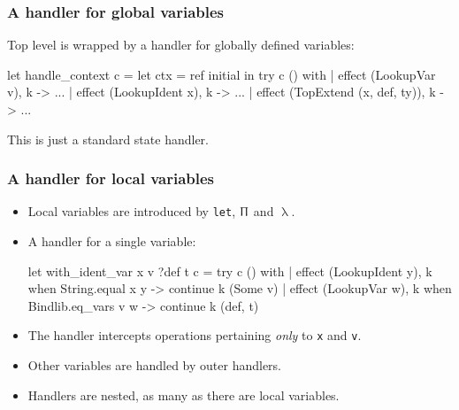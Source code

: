\documentclass[11pt,aspectratio=169,fleqn]{beamer}
\begin{document}
\begin{frame}[fragile]
  \frametitle{A handler for global variables}

Top level is wrapped by a handler for globally defined variables:

\begin{ocamllisting}
let handle_context c =
  let ctx = ref initial in
  try
    c ()
  with
   | effect (LookupVar v), k -> ...
   | effect (LookupIdent x), k -> ...
   | effect (TopExtend (x, def, ty)), k -> ...
\end{ocamllisting}

This is just a standard state handler.
\end{frame}


\begin{frame}[fragile]
  \frametitle{A handler for local variables}

  \begin{itemize}
  \item Local variables are introduced by \texttt{let}, $\Uppi$ and $\uplambda$.
  \item \pause
    A handler for a single variable:
{\footnotesize
\begin{ocamllisting}
let with_ident_var x v ?def t c =
  try
    c ()
  with
  | effect (LookupIdent y), k when String.equal x y ->
     continue k (Some v)
  | effect (LookupVar w), k when Bindlib.eq_vars v w ->
     continue k (def, t)
\end{ocamllisting}
}
  \item \pause
    The handler intercepts operations pertaining \emph{only} to \lstinline{x} and \lstinline{v}.
  \item Other variables are handled by outer handlers.
  \item Handlers are nested, as many as there are local variables.
  \end{itemize}

\end{frame}
\end{document}
